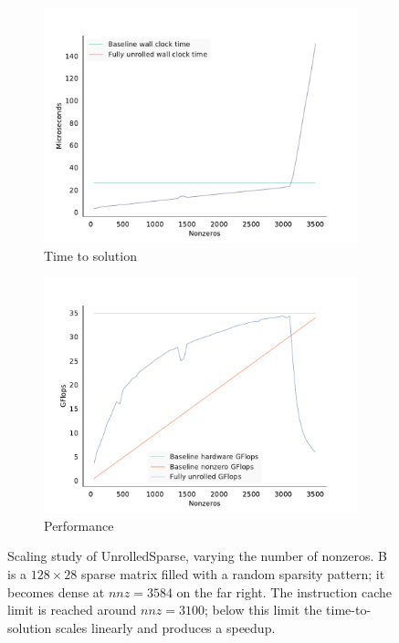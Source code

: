   \begin{figure}[H]
    \centering
    \begin{subfigure}[b]{0.75\textwidth}
      \centering
      \includegraphics[width=\textwidth]{images/fig2.pdf}
      \caption{Time to solution}
      \label{fig:unrolled_time}
    \end{subfigure}
    \begin{subfigure}[b]{0.75\textwidth}
      \centering
      \includegraphics[width=\textwidth]{images/fig3.pdf}
      \caption{Performance}
      \label{fig:unrolled_perf}
    \end{subfigure}
    \caption{Scaling study of UnrolledSparse, varying the number of nonzeros. B is a $128\times 28$ sparse matrix filled with a random sparsity pattern; it becomes dense at $nnz=3584$ on the far right. The instruction cache limit is reached around $nnz=3100$; below this limit the time-to-solution scales linearly and produces a speedup. }
    \label{fig:unrolled_scaling}
  \end{figure}




